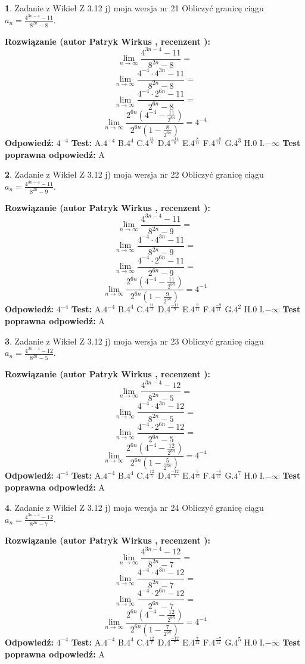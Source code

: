 \documentclass[12pt, a4paper]{article}
\theoremstyle{definition} %
\newtheorem{zad}{}
\newcommand{\zadStart}[1]{\begin{zad}#1\newline}
\newcommand{\zadStop}{\end{zad}}
\newcommand{\rozwStart}[2]{\noindent \textbf{Rozwiązanie (autor #1 , recenzent #2): }\newline}
\newcommand{\rozwStop}{\newline}
\newcommand{\odpStart}{\noindent \textbf{Odpowiedź:}\newline}
\newcommand{\odpStop}{\newline}
\newcommand{\testStart}{\noindent \textbf{Test:}\newline}
\newcommand{\testStop}{\newline}
\newcommand{\kluczStart}{\noindent \textbf{Test poprawna odpowiedź:}\newline}
\newcommand{\kluczStop}{\newline}
\begin{document}
\zadStart{Zadanie z Wikieł Z 3.12 j) moja wersja nr 21}
Obliczyć granicę ciągu $a_{n}=\frac{4^{3n-4}-11}{8^{2n}-8}$.
\zadStop
\rozwStart{Patryk Wirkus}{}
$$\lim\limits_{n\to\infty}\frac{4^{3n-4}-11}{8^{2n}-8}=$$
$$\lim\limits_{n\to\infty}\frac{4^{-4} \cdot 4^{3n}-11}{8^{2n}-8}=$$
$$\lim\limits_{n\to\infty}\frac{4^{-4} \cdot 2^{6n}-11}{2^{6n}-8}=$$
$$\lim\limits_{n\to\infty}\frac{2^{6n}(4^{-4} - \frac{11}{2^{6n}})}{2^{6n}(1-\frac{8}{2^{6n}})}= 4^{-4}$$
\rozwStop
\odpStart
$4^{-4}$
\odpStop
\testStart
A.$4^{-4}$
B.$4^{4}$
C.$4^{\frac{11}{8}}$
D.$4^{\frac{-11}{8}}$
E.$4^{\frac{8}{11}}$
F.$4^{\frac{-8}{11}}$
G.$4^{3}$
H.$0$
I.$-\infty$
\testStop
\kluczStart
A
\kluczStop



\zadStart{Zadanie z Wikieł Z 3.12 j) moja wersja nr 22}
Obliczyć granicę ciągu $a_{n}=\frac{4^{3n-4}-11}{8^{2n}-9}$.
\zadStop
\rozwStart{Patryk Wirkus}{}
$$\lim\limits_{n\to\infty}\frac{4^{3n-4}-11}{8^{2n}-9}=$$
$$\lim\limits_{n\to\infty}\frac{4^{-4} \cdot 4^{3n}-11}{8^{2n}-9}=$$
$$\lim\limits_{n\to\infty}\frac{4^{-4} \cdot 2^{6n}-11}{2^{6n}-9}=$$
$$\lim\limits_{n\to\infty}\frac{2^{6n}(4^{-4} - \frac{11}{2^{6n}})}{2^{6n}(1-\frac{9}{2^{6n}})}= 4^{-4}$$
\rozwStop
\odpStart
$4^{-4}$
\odpStop
\testStart
A.$4^{-4}$
B.$4^{4}$
C.$4^{\frac{11}{9}}$
D.$4^{\frac{-11}{9}}$
E.$4^{\frac{9}{11}}$
F.$4^{\frac{-9}{11}}$
G.$4^{2}$
H.$0$
I.$-\infty$
\testStop
\kluczStart
A
\kluczStop



\zadStart{Zadanie z Wikieł Z 3.12 j) moja wersja nr 23}
Obliczyć granicę ciągu $a_{n}=\frac{4^{3n-4}-12}{8^{2n}-5}$.
\zadStop
\rozwStart{Patryk Wirkus}{}
$$\lim\limits_{n\to\infty}\frac{4^{3n-4}-12}{8^{2n}-5}=$$
$$\lim\limits_{n\to\infty}\frac{4^{-4} \cdot 4^{3n}-12}{8^{2n}-5}=$$
$$\lim\limits_{n\to\infty}\frac{4^{-4} \cdot 2^{6n}-12}{2^{6n}-5}=$$
$$\lim\limits_{n\to\infty}\frac{2^{6n}(4^{-4} - \frac{12}{2^{6n}})}{2^{6n}(1-\frac{5}{2^{6n}})}= 4^{-4}$$
\rozwStop
\odpStart
$4^{-4}$
\odpStop
\testStart
A.$4^{-4}$
B.$4^{4}$
C.$4^{\frac{12}{5}}$
D.$4^{\frac{-12}{5}}$
E.$4^{\frac{5}{12}}$
F.$4^{\frac{-5}{12}}$
G.$4^{7}$
H.$0$
I.$-\infty$
\testStop
\kluczStart
A
\kluczStop



\zadStart{Zadanie z Wikieł Z 3.12 j) moja wersja nr 24}
Obliczyć granicę ciągu $a_{n}=\frac{4^{3n-4}-12}{8^{2n}-7}$.
\zadStop
\rozwStart{Patryk Wirkus}{}
$$\lim\limits_{n\to\infty}\frac{4^{3n-4}-12}{8^{2n}-7}=$$
$$\lim\limits_{n\to\infty}\frac{4^{-4} \cdot 4^{3n}-12}{8^{2n}-7}=$$
$$\lim\limits_{n\to\infty}\frac{4^{-4} \cdot 2^{6n}-12}{2^{6n}-7}=$$
$$\lim\limits_{n\to\infty}\frac{2^{6n}(4^{-4} - \frac{12}{2^{6n}})}{2^{6n}(1-\frac{7}{2^{6n}})}= 4^{-4}$$
\rozwStop
\odpStart
$4^{-4}$
\odpStop
\testStart
A.$4^{-4}$
B.$4^{4}$
C.$4^{\frac{12}{7}}$
D.$4^{\frac{-12}{7}}$
E.$4^{\frac{7}{12}}$
F.$4^{\frac{-7}{12}}$
G.$4^{5}$
H.$0$
I.$-\infty$
\testStop
\kluczStart
A
\kluczStop
\end{document}
